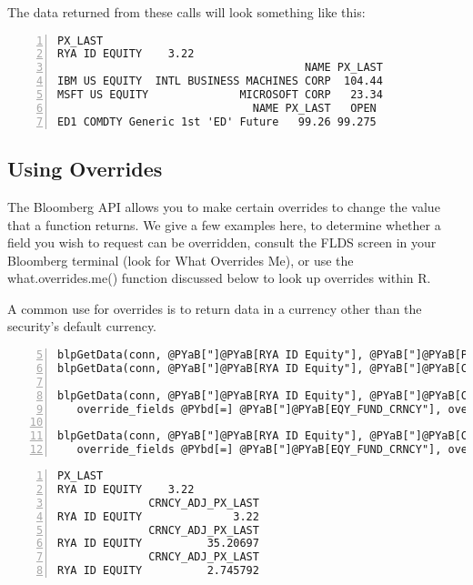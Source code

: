 \documentclass[a4paper]{article}
\begin{document}
    

The data returned from these calls will look something like this:

\begin{Verbatim}[commandchars=@\[\],numbers=left,firstnumber=1,stepnumber=1]
              PX_LAST
RYA ID EQUITY    3.22
                                      NAME PX_LAST
IBM US EQUITY  INTL BUSINESS MACHINES CORP  104.44
MSFT US EQUITY              MICROSOFT CORP   23.34
                              NAME PX_LAST   OPEN
ED1 COMDTY Generic 1st 'ED' Future   99.26 99.275
\end{Verbatim}

    


\subsection{Using Overrides} %
\label{sub:using_overrides}

The Bloomberg API allows you to make certain overrides to change the value that a function returns. We give a few examples here, to determine whether a field you wish to request can be overridden, consult the FLDS screen in your Bloomberg terminal (look for What Overrides Me), or use the what.overrides.me() function discussed below to look up overrides within R.

A common use for overrides is to return data in a currency other than the security's default currency.

\begin{Verbatim}[commandchars=@\[\],numbers=left,firstnumber=5,stepnumber=1]
blpGetData(conn, @PYaB["]@PYaB[RYA ID Equity"], @PYaB["]@PYaB[PX_LAST"])
blpGetData(conn, @PYaB["]@PYaB[RYA ID Equity"], @PYaB["]@PYaB[CRNCY_ADJ_PX_LAST"])

blpGetData(conn, @PYaB["]@PYaB[RYA ID Equity"], @PYaB["]@PYaB[CRNCY_ADJ_PX_LAST"], 
   override_fields @PYbd[=] @PYaB["]@PYaB[EQY_FUND_CRNCY"], overrides @PYbd[=] @PYaB["]@PYaB[HKD"])

blpGetData(conn, @PYaB["]@PYaB[RYA ID Equity"], @PYaB["]@PYaB[CRNCY_ADJ_PX_LAST"], 
   override_fields @PYbd[=] @PYaB["]@PYaB[EQY_FUND_CRNCY"], overrides @PYbd[=] @PYaB["]@PYaB[GBP"])
\end{Verbatim}

    

\begin{Verbatim}[commandchars=@\[\],numbers=left,firstnumber=1,stepnumber=1]
              PX_LAST
RYA ID EQUITY    3.22
              CRNCY_ADJ_PX_LAST
RYA ID EQUITY              3.22
              CRNCY_ADJ_PX_LAST
RYA ID EQUITY          35.20697
              CRNCY_ADJ_PX_LAST
RYA ID EQUITY          2.745792
\end{Verbatim}
\end{document}
